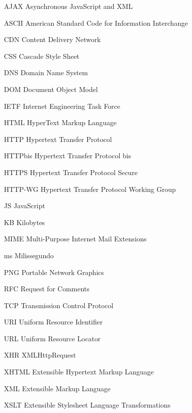 %
%

\begin{siglas}
	\item[AJAX] Asynchronous JavaScript and XML
	\item[ASCII] American Standard Code for Information Interchange
	\item[CDN] Content Delivery Network
	\item[CSS] Cascade Style Sheet
	\item[DNS] Domain Name System
	\item[DOM] Document Object Model
	\item[IETF] Internet Engineering Task Force
    \item[HTML] HyperText Markup Language
    \item[HTTP] Hypertext Transfer Protocol
    \item[HTTPbis] Hypertext Transfer Protocol bis
	\item[HTTPS] Hypertext Transfer Protocol Secure
    \item[HTTP-WG] Hypertext Transfer Protocol Working Group
    \item[JS] JavaScript
    \item[KB] Kilobytes
    \item[MIME] Multi-Purpose Internet Mail Extensions
    \item[ms] Milissegundo
    \item[PNG] Portable Network Graphics
    \item[RFC] Request for Comments
    \item[TCP] Transmission Control Protocol
    \item[URI] Uniform Resource Identifier
    \item[URL] Uniform Resource Locator
    \item[XHR] XMLHttpRequest
    \item[XHTML] Extensible Hypertext Markup Language
    \item[XML] Extensible Markup Language
    \item[XSLT] Extensible Stylesheet Language Transformations
\end{siglas}
